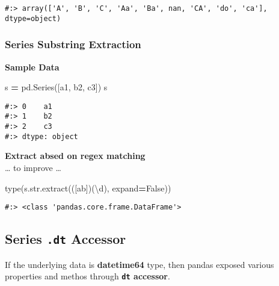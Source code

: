 \documentclass[
]{book}
\newenvironment{Shaded}{\begin{snugshade}}{\end{snugshade}}
\newcommand{\BuiltInTok}[1]{#1}
\newcommand{\NormalTok}[1]{#1}
\newcommand{\OperatorTok}[1]{\textcolor[rgb]{0.43,0.43,0.43}{\textbf{#1}}}
\newcommand{\StringTok}[1]{\textcolor[rgb]{0.5,0.5,0.5}{#1}}
\newcommand{\VariableTok}[1]{\textcolor[rgb]{0,0,0}{#1}}
\begin{document}
\begin{verbatim}
#:> array(['A', 'B', 'C', 'Aa', 'Ba', nan, 'CA', 'do', 'ca'], dtype=object)
\end{verbatim}

\hypertarget{series-substring-extraction}{%
\subsubsection{Series Substring Extraction}\label{series-substring-extraction}}

\textbf{Sample Data}

\begin{Shaded}
\begin{Highlighting}[]
\NormalTok{s }\OperatorTok{=}\NormalTok{ pd.Series([}\StringTok{\textquotesingle{}a1\textquotesingle{}}\NormalTok{, }\StringTok{\textquotesingle{}b2\textquotesingle{}}\NormalTok{, }\StringTok{\textquotesingle{}c3\textquotesingle{}}\NormalTok{])}
\NormalTok{s}
\end{Highlighting}
\end{Shaded}

\begin{verbatim}
#:> 0    a1
#:> 1    b2
#:> 2    c3
#:> dtype: object
\end{verbatim}

\textbf{Extract absed on regex matching}\\
\ldots{} to improve \ldots{}

\begin{Shaded}
\begin{Highlighting}[]
\BuiltInTok{type}\NormalTok{(s.}\BuiltInTok{str}\NormalTok{.extract(}\StringTok{\textquotesingle{}([ab])(\textbackslash{}d)\textquotesingle{}}\NormalTok{, expand}\OperatorTok{=}\VariableTok{False}\NormalTok{))}
\end{Highlighting}
\end{Shaded}

\begin{verbatim}
#:> <class 'pandas.core.frame.DataFrame'>
\end{verbatim}

\hypertarget{series-.dt-accessor}{%
\subsection{\texorpdfstring{Series \texttt{.dt} Accessor}{Series .dt Accessor}}\label{series-.dt-accessor}}

If the underlying data is \textbf{datetime64} type, then pandas exposed various properties and methos through \textbf{\texttt{dt} accessor}.
\end{document}
